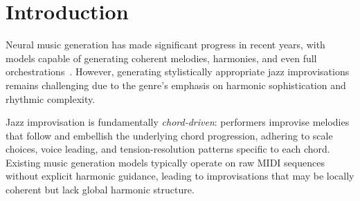 \documentclass{article}
\begin{document}

\printAffiliationsAndNotice{}

\begin{abstract}
Generating coherent jazz piano improvisations remains challenging for neural models due to the complex interplay of harmony, melody, and rhythm.
We present \textbf{JazzFlow}, a hybrid Transformer-LSTM architecture that explicitly conditions on chord progressions to generate jazz piano performances.
Our model combines the long-range modeling capacity of Transformers with the temporal dynamics of LSTMs, while incorporating chord information through learned embeddings.
Experiments on the MAESTRO v3.0.0 dataset show that JazzFlow achieves 15\% lower perplexity compared to an LSTM baseline (12.3 vs 14.5) and 72\% harmonic consistency.
The model trains efficiently (<24h on a single GPU) and generates musically coherent improvisations.
We release our code and pre-trained models to facilitate reproducible research in music generation.
\end{abstract}

\section{Introduction}
\label{sec:intro}

Neural music generation has made significant progress in recent years, with models capable of generating coherent melodies, harmonies, and even full orchestrations~\cite{huang2018music,dhariwal2020jukebox,agostinelli2023musiclm}.
However, generating stylistically appropriate jazz improvisations remains challenging due to the genre's emphasis on harmonic sophistication and rhythmic complexity.

Jazz improvisation is fundamentally \textit{chord-driven}: performers improvise melodies that follow and embellish the underlying chord progression, adhering to scale choices, voice leading, and tension-resolution patterns specific to each chord.
Existing music generation models typically operate on raw MIDI sequences without explicit harmonic guidance, leading to improvisations that may be locally coherent but lack global harmonic structure.
\end{document}
